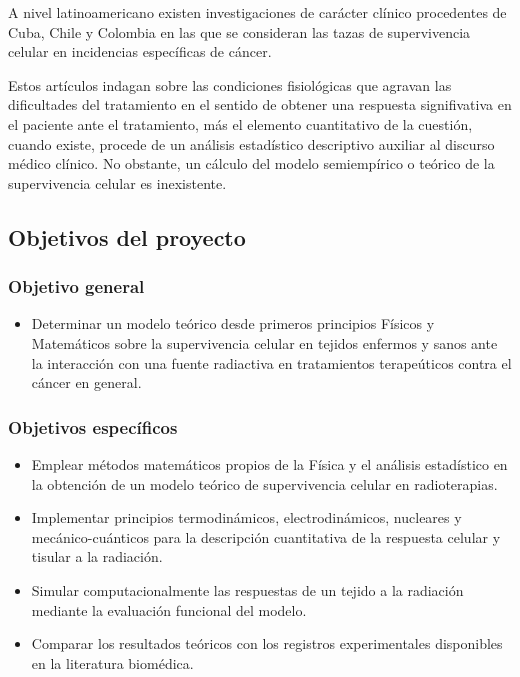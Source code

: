 \documentclass[12pt,letterpaper]{article}
\begin{document}
		A nivel latinoamericano existen investigaciones de carácter clínico procedentes de Cuba, Chile y Colombia en las que se consideran las tazas de supervivencia celular en incidencias específicas de cáncer. 
		
		Estos artículos indagan sobre las condiciones fisiológicas que agravan las dificultades del tratamiento en el sentido de obtener una respuesta signifivativa en el paciente ante el tratamiento, más el elemento cuantitativo de la cuestión, cuando existe, procede de un análisis estadístico descriptivo auxiliar al discurso médico clínico. No obstante, un cálculo del modelo semiempírico o teórico de la supervivencia celular es inexistente. 
		
		\subsection*{Objetivos del proyecto}
			\subsubsection*{Objetivo general}
			\begin{itemize}
				\item Determinar un modelo teórico desde primeros principios Físicos y Matemáticos sobre la supervivencia celular en tejidos enfermos y sanos ante la interacción con una fuente radiactiva en tratamientos terapeúticos contra el cáncer en general.
			\end{itemize}
			\subsubsection*{Objetivos específicos}
				\begin{itemize}
					\item Emplear métodos matemáticos propios de la Física y el análisis estadístico en la obtención de un modelo teórico de supervivencia celular en radioterapias. 
					\item Implementar principios termodinámicos, electrodinámicos, nucleares y mecánico-cuánticos para la descripción cuantitativa de la respuesta celular y tisular a la radiación. 
					\item Simular computacionalmente las respuestas de un tejido a la radiación mediante la evaluación funcional del modelo. 
					\item Comparar los resultados teóricos con los registros experimentales disponibles en la literatura biomédica. 
				\end{itemize}
			
\end{document}
